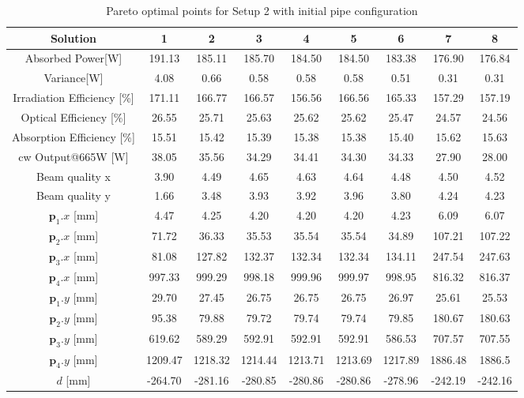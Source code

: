 \documentclass[a4paper,10pt]{article}
\renewcommand{\vec}[1]{\mathbf{#1}}
\begin{document}
    \begin{table}
    \centering
    \setlength\tabcolsep{2pt}
    \renewcommand{\arraystretch}{1.5}
    \begin{tabular}{| c | c | c | c | c | c | c | c | c |}
        \hline
        Solution      &1&2&3&4&5&6&7&8\\
        \hline
        Absorbed Power[W] &191.13&185.11&185.70&184.50&184.50&183.38&176.90&176.84\\
        \hline
        Variance[W] &4.08&0.66&0.58&0.58&0.58&0.51&0.31&0.31\\
        \hline
        Irradiation Efficiency [\%]&171.11&166.77&166.57&156.56&166.56&165.33&157.29&157.19\\
        \hline
        Optical Efficiency [\%]&26.55&25.71&25.63&25.62&25.62&25.47&24.57&24.56\\
        \hline
        Absorption Efficiency [\%]&15.51&15.42&15.39&15.38&15.38&15.40&15.62&15.63\\
        \hline
        cw Output@665W [W]  &38.05&35.56&34.29&34.41&34.30&34.33&27.90&28.00\\
        \hline
        Beam quality x&3.90&4.49&4.65&4.63&4.64&4.48&4.50&4.52\\
        \hline
        Beam quality y&1.66&3.48&3.93&3.92&3.96&3.80&4.24&4.23\\
        \hline
        $\vec{p}_1.x$ [mm]&4.47&4.25&4.20&4.20&4.20&4.23&6.09&6.07\\
        \hline
        $\vec{p}_2.x$ [mm]&71.72&36.33&35.53&35.54&35.54&34.89&107.21&107.22\\
        \hline
        $\vec{p}_3.x$ [mm]&81.08&127.82&132.37&132.34&132.34&134.11&247.54&247.63\\ 
        \hline
        $\vec{p}_4.x$ [mm]&997.33&999.29&998.18&999.96&999.97&998.95&816.32&816.37\\ 
        \hline
        $\vec{p}_1.y$ [mm]&29.70&27.45&26.75&26.75&26.75&26.97&25.61&25.53\\
        \hline
        $\vec{p}_2.y$ [mm]&95.38&79.88&79.72&79.74&79.74&79.85&180.67&180.63\\
        \hline
        $\vec{p}_3.y$ [mm]&619.62&589.29&592.91&592.91&592.91&586.53&707.57&707.55\\ 
        \hline
        $\vec{p}_4.y$ [mm]&1209.47&1218.32&1214.44&1213.71&1213.69&1217.89&1886.48&1886.5\\ 
        \hline
        $d$           [mm]&-264.70&-281.16&-280.85&-280.86&-280.86&-278.96&-242.19&-242.16\\
        \hline
    \end{tabular}
    \label{tab:setup2_results_pipe}
    \caption{Pareto optimal points for Setup 2 with initial pipe configuration}
    \end{table}
\end{document}
